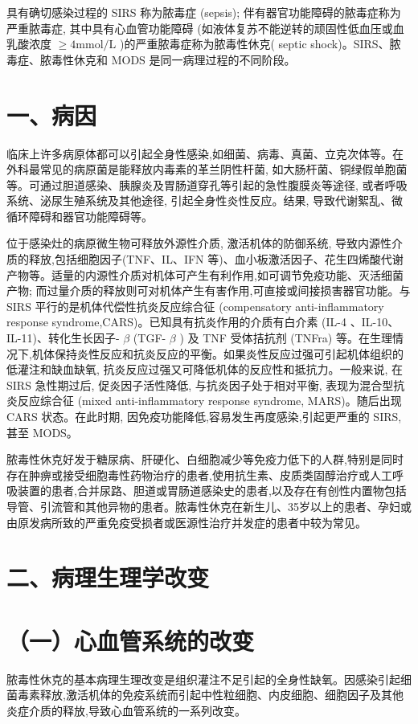 \documentclass[10pt]{article}
\begin{document}
具有确切感染过程的 SIRS 称为脓毒症 (sepsis); 伴有器官功能障碍的脓毒症称为严重脓毒症, 其中具有心血管功能障碍 (如液体复苏不能逆转的顽固性低血压或血乳酸浓度 $\geqslant 4 \mathrm{mmol} / \mathrm{L}$ )的严重脓毒症称为脓毒性休克( septic shock)。SIRS、脓毒症、脓毒性休克和 MODS 是同一病理过程的不同阶段。

\section*{一、病因}
临床上许多病原体都可以引起全身性感染,如细菌、病毒、真菌、立克次体等。在外科最常见的病原菌是能释放内毒素的革兰阴性杆菌, 如大肠杆菌、铜绿假单胞菌等。可通过胆道感染、胰腺炎及胃肠道穿孔等引起的急性腹膜炎等途径, 或者呼吸系统、泌尿生殖系统及其他途径, 引起全身性炎性反应。结果, 导致代谢絮乱、微循环障碍和器官功能障碍等。

位于感染灶的病原微生物可释放外源性介质, 激活机体的防御系统, 导致内源性介质的释放,包括细胞因子(TNF、IL、IFN 等)、血小板激活因子、花生四烯酸代谢产物等。适量的内源性介质对机体可产生有利作用,如可调节免疫功能、灭活细菌产物; 而过量介质的释放则可对机体产生有害作用,可直接或间接损害器官功能。与 SIRS 平行的是机体代偿性抗炎反应综合征 (compensatory anti-inflammatory response syndrome,CARS)。已知具有抗炎作用的介质有白介素 (IL-4 、IL-10、IL-11)、转化生长因子- $\beta$ (TGF- $\beta$ ) 及 TNF 受体拮抗剂 (TNFra) 等。在生理情况下,机体保持炎性反应和抗炎反应的平衡。如果炎性反应过强可引起机体组织的低灌注和缺血缺氧, 抗炎反应过强又可降低机体的反应性和抵抗力。一般来说, 在 SIRS 急性期过后, 促炎因子活性降低, 与抗炎因子处于相对平衡, 表现为混合型抗炎反应综合征 (mixed anti-inflammatory response syndrome, MARS)。随后出现 CARS 状态。在此时期, 因免疫功能降低,容易发生再度感染,引起更严重的 SIRS, 甚至 MODS。

脓毒性休克好发于糖尿病、肝硬化、白细胞减少等免疫力低下的人群,特别是同时存在肿痹或接受细胞毒性药物治疗的患者,使用抗生素、皮质类固醇治疗或人工呼吸装置的患者,合并尿路、胆道或胃肠道感染史的患者,以及存在有创性内置物包括导管、引流管和其他异物的患者。脓毒性休克在新生儿、35岁以上的患者、孕妇或由原发病所致的严重免疫受损者或医源性治疗并发症的患者中较为常见。

\section*{二、病理生理学改变}
\section*{（一）心血管系统的改变}
脓毒性休克的基本病理生理改变是组织灌注不足引起的全身性缺氧。因感染引起细菌毒素释放,激活机体的免疫系统而引起中性粒细胞、内皮细胞、细胞因子及其他炎症介质的释放,导致心血管系统的一系列改变。
\end{document}
